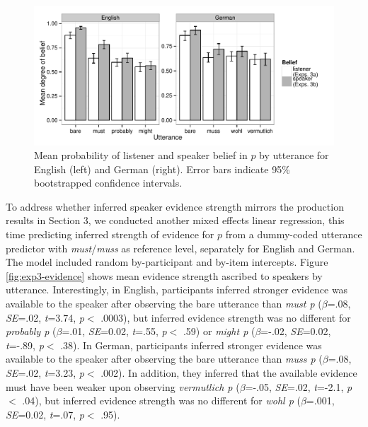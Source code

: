 \documentclass[11pt]{article}
\newcommand{\figref}[1]{Figure \ref{#1}}
\begin{document}
\begin{figure}
	\centering
	\includegraphics[width=\textwidth]{pics/mean-beliefs}
	\caption{Mean probability of listener and speaker belief in $p$ by utterance for English (left) and German (right). Error bars indicate 95\% bootstrapped confidence intervals.}
	\label{fig:expt3}
\end{figure}

To address whether inferred speaker evidence strength mirrors the production results in Section 3, we conducted another mixed effects linear regression, this time predicting inferred strength of evidence for $p$ from a dummy-coded utterance predictor with \emph{must}/\emph{muss} as reference level, separately for English and German. The model included random by-participant and by-item intercepts.  \figref{fig:exp3-evidence} shows mean evidence strength ascribed to speakers by utterance. Interestingly, in English, participants inferred stronger evidence was available to the speaker after observing the bare utterance than \emph{must p} ($\beta$=.08, \emph{SE}=.02, \emph{t}=3.74, \emph{p}$<$ .0003), but inferred evidence strength was no different for \emph{probably p} ($\beta$=.01, \emph{SE}=0.02, \emph{t}=.55, \emph{p}$<$ .59) or \emph{might p} ($\beta$=-.02, \emph{SE}=0.02, \emph{t}=-.89, \emph{p}$<$ .38). In German, participants inferred stronger evidence was available to the speaker after observing the bare utterance than \emph{muss p} ($\beta$=.08, \emph{SE}=.02, \emph{t}=3.23, \emph{p}$<$ .002). In addition, they inferred that the available evidence must have been weaker upon observing \emph{vermutlich p} ($\beta$=-.05, \emph{SE}=.02, \emph{t}=-2.1, \emph{p}$<$ .04), but inferred evidence strength was no different for \emph{wohl p} ($\beta$=.001, \emph{SE}=0.02, \emph{t}=.07, \emph{p}$<$ .95). %
\end{document}
